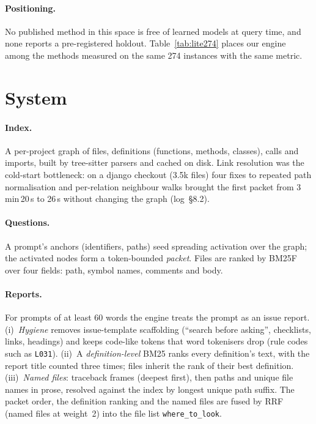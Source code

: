 \documentclass[10pt,twocolumn]{article}
\begin{document}
\paragraph{Positioning.}
No published method in this space is free of learned models at query time, and none reports a
pre-registered holdout. Table~\ref{tab:lite274} places our engine among the methods measured on the
same 274 instances with the same metric.

\section{System}
\label{sec:system}

\paragraph{Index.}
A per-project graph of files, definitions (functions, methods, classes), calls and imports, built by
tree-sitter parsers and cached on disk. Link resolution was the cold-start bottleneck: on a django
checkout (3.5k files) four fixes to repeated path normalisation and per-relation neighbour walks
brought the first packet from 3\,min\,20\,s to 26\,s without changing the graph (log~\S8.2).

\paragraph{Questions.}
A prompt's anchors (identifiers, paths) seed spreading activation over the graph; the activated
nodes form a token-bounded \emph{packet}. Files are ranked by BM25F over four fields: path, symbol
names, comments and body.

\paragraph{Reports.}
For prompts of at least 60 words the engine treats the prompt as an issue report. (i)~\emph{Hygiene}
removes issue-template scaffolding (``search before asking'', checklists, links, headings) and keeps
code-like tokens that word tokenisers drop (rule codes such as \texttt{L031}). (ii)~A
\emph{definition-level} BM25 ranks every definition's text, with the report title counted three
times; files inherit the rank of their best definition. (iii)~\emph{Named files}: traceback frames
(deepest first), then paths and unique file names in prose, resolved against the index by longest
unique path suffix. The packet order, the definition ranking and the named files are fused by RRF
(named files at weight~2) into the file list \texttt{where\_to\_look}.
\end{document}
